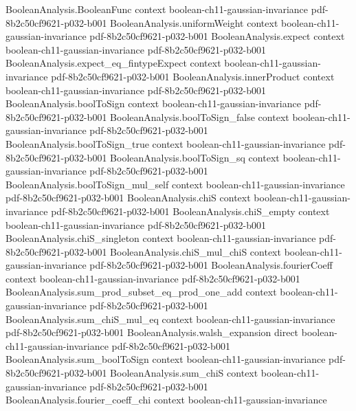 \begin{theorem}
\proofstep
  {BooleanAnalysis.BooleanFunc}
  {context}
  {boolean-ch11-gaussian-invariance}
  {pdf-8b2c50cf9621-p032-b001}
\proofstep
  {BooleanAnalysis.uniformWeight}
  {context}
  {boolean-ch11-gaussian-invariance}
  {pdf-8b2c50cf9621-p032-b001}
\proofstep
  {BooleanAnalysis.expect}
  {context}
  {boolean-ch11-gaussian-invariance}
  {pdf-8b2c50cf9621-p032-b001}
\proofstep
  {BooleanAnalysis.expect_eq_fintypeExpect}
  {context}
  {boolean-ch11-gaussian-invariance}
  {pdf-8b2c50cf9621-p032-b001}
\proofstep
  {BooleanAnalysis.innerProduct}
  {context}
  {boolean-ch11-gaussian-invariance}
  {pdf-8b2c50cf9621-p032-b001}
\proofstep
  {BooleanAnalysis.boolToSign}
  {context}
  {boolean-ch11-gaussian-invariance}
  {pdf-8b2c50cf9621-p032-b001}
\proofstep
  {BooleanAnalysis.boolToSign_false}
  {context}
  {boolean-ch11-gaussian-invariance}
  {pdf-8b2c50cf9621-p032-b001}
\proofstep
  {BooleanAnalysis.boolToSign_true}
  {context}
  {boolean-ch11-gaussian-invariance}
  {pdf-8b2c50cf9621-p032-b001}
\proofstep
  {BooleanAnalysis.boolToSign_sq}
  {context}
  {boolean-ch11-gaussian-invariance}
  {pdf-8b2c50cf9621-p032-b001}
\proofstep
  {BooleanAnalysis.boolToSign_mul_self}
  {context}
  {boolean-ch11-gaussian-invariance}
  {pdf-8b2c50cf9621-p032-b001}
\proofstep
  {BooleanAnalysis.chiS}
  {context}
  {boolean-ch11-gaussian-invariance}
  {pdf-8b2c50cf9621-p032-b001}
\proofstep
  {BooleanAnalysis.chiS_empty}
  {context}
  {boolean-ch11-gaussian-invariance}
  {pdf-8b2c50cf9621-p032-b001}
\proofstep
  {BooleanAnalysis.chiS_singleton}
  {context}
  {boolean-ch11-gaussian-invariance}
  {pdf-8b2c50cf9621-p032-b001}
\proofstep
  {BooleanAnalysis.chiS_mul_chiS}
  {context}
  {boolean-ch11-gaussian-invariance}
  {pdf-8b2c50cf9621-p032-b001}
\proofstep
  {BooleanAnalysis.fourierCoeff}
  {context}
  {boolean-ch11-gaussian-invariance}
  {pdf-8b2c50cf9621-p032-b001}
\proofstep
  {BooleanAnalysis.sum_prod_subset_eq_prod_one_add}
  {context}
  {boolean-ch11-gaussian-invariance}
  {pdf-8b2c50cf9621-p032-b001}
\proofstep
  {BooleanAnalysis.sum_chiS_mul_eq}
  {context}
  {boolean-ch11-gaussian-invariance}
  {pdf-8b2c50cf9621-p032-b001}
\proofstep
  {BooleanAnalysis.walsh_expansion}
  {direct}
  {boolean-ch11-gaussian-invariance}
  {pdf-8b2c50cf9621-p032-b001}
\proofstep
  {BooleanAnalysis.sum_boolToSign}
  {context}
  {boolean-ch11-gaussian-invariance}
  {pdf-8b2c50cf9621-p032-b001}
\proofstep
  {BooleanAnalysis.sum_chiS}
  {context}
  {boolean-ch11-gaussian-invariance}
  {pdf-8b2c50cf9621-p032-b001}
\proofstep
  {BooleanAnalysis.fourier_coeff_chi}
  {context}
  {boolean-ch11-gaussian-invariance}

\end{theorem}
